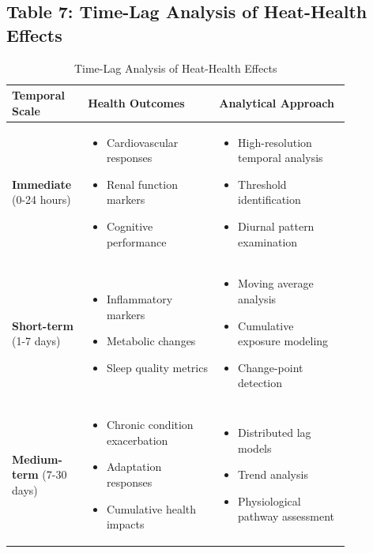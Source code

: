 \documentclass[12pt,a4paper,landscape]{article}
\begin{document}
\subsection*{Table 7: Time-Lag Analysis of Heat-Health Effects}
\begin{table}[H]
\centering
\caption{Time-Lag Analysis of Heat-Health Effects}
\label{tab:time_lag}
\begin{tabular}{p{0.15\linewidth}p{0.35\linewidth}p{0.35\linewidth}}
\toprule
\textbf{Temporal Scale} & \textbf{Health Outcomes} & \textbf{Analytical Approach} \\
\midrule
\textbf{Immediate} \newline(0-24 hours) & 
\begin{itemize}[leftmargin=*]
    \item Cardiovascular responses
    \item Renal function markers
    \item Cognitive performance
\end{itemize} & 
\begin{itemize}[leftmargin=*]
    \item High-resolution temporal analysis
    \item Threshold identification
    \item Diurnal pattern examination
\end{itemize} \\
\midrule
\textbf{Short-term} \newline(1-7 days) & 
\begin{itemize}[leftmargin=*]
    \item Inflammatory markers
    \item Metabolic changes
    \item Sleep quality metrics
\end{itemize} & 
\begin{itemize}[leftmargin=*]
    \item Moving average analysis
    \item Cumulative exposure modeling
    \item Change-point detection
\end{itemize} \\
\midrule
\textbf{Medium-term} \newline(7-30 days) & 
\begin{itemize}[leftmargin=*]
    \item Chronic condition exacerbation
    \item Adaptation responses
    \item Cumulative health impacts
\end{itemize} & 
\begin{itemize}[leftmargin=*]
    \item Distributed lag models
    \item Trend analysis
    \item Physiological pathway assessment
\end{itemize} \\
\bottomrule
\end{tabular}
\end{table}
\clearpage
\end{document}
